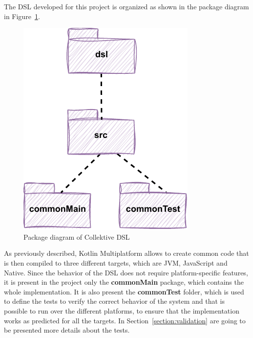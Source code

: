 The DSL developed for this project is organized as shown in the package diagram in Figure~\ref{fig:dsl_packege_diagram}.
\begin{figure}[!ht]
    \centering
    \includegraphics[scale=1]{document/chapters/4-collektive/images/dsl_package_diagram.pdf}
    \caption{Package diagram of Collektive DSL}
    \label{fig:dsl_packege_diagram}
\end{figure}
As previously described, Kotlin Multiplatform allows to create common code that is then compiled to three different targets, which are JVM, JavaScript and Native. Since the behavior of the DSL does not require platform-specific features, it is present in the project only the \textbf{commonMain} package, which contains the whole implementation.\newline
It is also present the \textbf{commonTest} folder, which is used to define the tests to verify the correct behavior of the system and that is possible to run over the different platforms, to ensure that the implementation works as predicted for all the targets. In Section~\ref{section:validation} are going to be presented more details about the tests.

